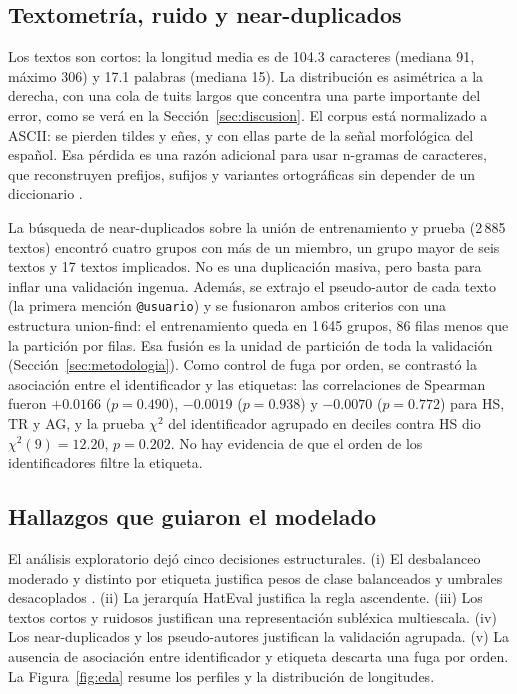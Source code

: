 \subsection{Textometría, ruido y near-duplicados}

Los textos son cortos: la longitud media es de 104.3 caracteres (mediana 91,
máximo 306) y 17.1 palabras (mediana 15). La distribución es asimétrica a la
derecha, con una cola de tuits largos que concentra una parte importante del
error, como se verá en la Sección~\ref{sec:discusion}. El corpus está
normalizado a ASCII: se pierden tildes y eñes, y con ellas parte de la señal
morfológica del español. Esa pérdida es una razón adicional para usar
n-gramas de caracteres, que reconstruyen prefijos, sufijos y variantes
ortográficas sin depender de un diccionario \cite{cavnar1994ngram,mcnamee2004character}.

La búsqueda de near-duplicados sobre la unión de entrenamiento y prueba
(2\,885 textos) encontró cuatro grupos con más de un miembro, un grupo mayor
de seis textos y 17 textos implicados. No es una duplicación masiva, pero
basta para inflar una validación ingenua. Además, se extrajo el pseudo-autor
de cada texto (la primera mención \texttt{@usuario}) y se fusionaron ambos
criterios con una estructura union-find: el entrenamiento queda en 1\,645
grupos, 86 filas menos que la partición por filas. Esa fusión es la unidad de
partición de toda la validación (Sección~\ref{sec:metodologia}). Como control
de fuga por orden, se contrastó la asociación entre el identificador y las
etiquetas: las correlaciones de Spearman fueron $+0.0166$ ($p=0.490$),
$-0.0019$ ($p=0.938$) y $-0.0070$ ($p=0.772$) para HS, TR y AG, y la prueba
$\chi^2$ del identificador agrupado en deciles contra HS dio $\chi^2(9)=12.20$, $p=0.202$. No hay evidencia de que el orden de los identificadores filtre
la etiqueta.

\subsection{Hallazgos que guiaron el modelado}

El análisis exploratorio dejó cinco decisiones estructurales. (i) El
desbalanceo moderado y distinto por etiqueta justifica pesos de clase
balanceados y umbrales desacoplados \cite{japkowicz2002class,lipton2014thresholding}.
(ii) La jerarquía HatEval justifica la regla ascendente. (iii) Los textos
cortos y ruidosos justifican una representación subléxica multiescala.
(iv) Los near-duplicados y los pseudo-autores justifican la validación
agrupada. (v) La ausencia de asociación entre identificador y etiqueta
descarta una fuga por orden. La Figura~\ref{fig:eda} resume los perfiles y
la distribución de longitudes.

